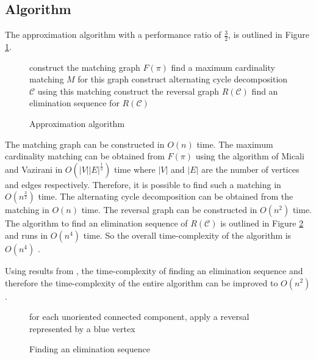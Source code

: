 \documentclass[11pt,DIV=11]{scrartcl}
\theoremstyle{definition}
\theoremstyle{remark}
\begin{document}
\subsection{Algorithm}
\label{sec:algorithm}

The approximation algorithm with a performance ratio of $\frac{3}{2}$, is outlined in Figure \ref{alg:approximation}.

\begin{figure}[htb]
    \begin{algorithm}[H]
        construct the matching graph $F(\pi)$\;
        find a maximum cardinality matching $M$ for this graph\;
        construct alternating cycle decomposition $\mathcal{C}$ using this matching\;
        construct the reversal graph $R(\mathcal{C})$\;
        find an elimination sequence for $R(\mathcal{C})$\;
        \caption{Approximation algorithm \cite{Christie1998}}
    \end{algorithm}
    \caption{}
    \label{alg:approximation}
\end{figure}

The matching graph can be constructed in $O(n)$ time. The maximum cardinality matching can be obtained from $F(\pi)$ using the algorithm of Micali and Vazirani in $O(|V||E|^{\frac{1}{2}})$ time \cite{Micali1980} where $|V|$ and $|E|$ are the number of vertices and edges respectively. Therefore, it is possible to find such a matching in $O(n^{\frac{3}{2}})$ time. The alternating cycle decomposition can be obtained from the matching in $O(n)$ time. The reversal graph can be constructed in $O(n^2)$ time. The algorithm to find an elimination sequence of $R(\mathcal{C})$ is outlined in Figure \ref{alg:elimination_sequence} and runs in $O(n^4)$ time. So the overall time-complexity of the algorithm is $O(n^4)$ \cite{Christie1998}.

Using results from \citeauthor*{Kaplan1997}, the time-complexity of finding an elimination sequence and therefore the time-complexity of the entire algorithm can be improved to $O(n^2)$ \cite{Kaplan1997}.

\begin{figure}[htb]
    \begin{algorithm}[H]
        for each unoriented connected component, apply a reversal represented by a blue vertex\;
        \caption{Finding an elimination sequence \cite{Christie1998}}
    \end{algorithm}
    \caption{}
    \label{alg:elimination_sequence}
\end{figure}
\end{document}
